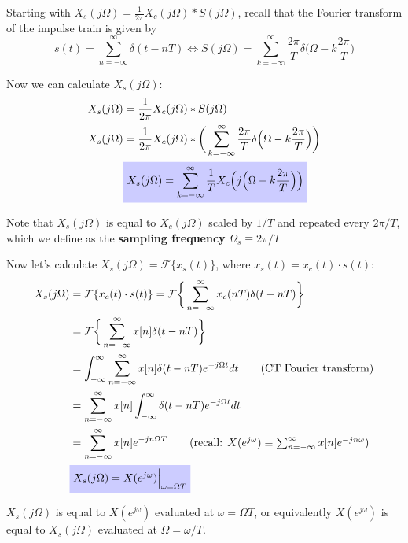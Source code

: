 \documentclass[10pt, aspectratio=169]{beamer}
\begin{document}
%
\begin{frame}

Starting with $X_s(j\Omega) = \frac{1}{2\pi}X_c(j\Omega)\ast S(j\Omega)$, recall that the Fourier transform of the impulse train is given by
\begin{equation*}
s(t) = \sum_{n=-\infty}^\infty \delta(t-nT) \Longleftrightarrow S(j\Omega) = \sum_{k=-\infty}^\infty \frac{2\pi}{T}\delta\Big(\Omega-k\frac{2\pi}{T}\Big)
\end{equation*}

Now we can calculate $X_s(j\Omega)$:
\begin{align} \nonumber
X_s(j\Omega) &= \frac{1}{2\pi}X_c(j\Omega) \ast S(j\Omega) \\ \nonumber
X_s(j\Omega) &= \frac{1}{2\pi}X_c(j\Omega) \ast \bigg(\sum_{k=-\infty}^\infty\frac{2\pi}{T}\delta\Big(\Omega-k\frac{2\pi}{T}\Big)\bigg) \\ 
&\tikz[baseline]{
	\node[fill=blue!20,anchor=base] (t1) {$X_s(j\Omega) = \displaystyle\sum_{k=-\infty}^\infty\frac{1}{T}X_c\Big(j\Big(\Omega-k\frac{2\pi}{T}\Big)\Big)$};} \label{eq:Xs1}
\end{align}

Note that $X_s(j\Omega)$ is equal to $X_c(j\Omega)$ scaled by $1/T$ and repeated every $2\pi/T$, which we define as the \textbf{sampling frequency} $\Omega_s \equiv  2\pi/T$
\end{frame}

%
\begin{frame}
Now let's calculate $X_s(j\Omega) = \mathcal{F}\{x_s(t)\}$, where $x_s(t) = x_c(t)\cdot s(t)$:
\begin{align} \nonumber
X_s(j\Omega) &= \mathcal{F}\{x_c(t)\cdot s(t)\} = \mathcal{F}\bigg\lbrace \sum_{n=-\infty}^{\infty} x_c(nT)\delta(t-nT) \bigg\rbrace \\ \nonumber
&= \mathcal{F}\bigg\lbrace \sum_{n=-\infty}^{\infty} x[n]\delta(t-nT) \bigg\rbrace \\ \nonumber
&= \int_{-\infty}^{\infty}\sum_{n=-\infty}^{\infty} x[n]\delta(t-nT)e^{-j\Omega t}dt \tag{CT Fourier transform} \\ \nonumber
&= \sum_{n=-\infty}^{\infty} x[n]\int_{-\infty}^{\infty}\delta(t-nT)e^{-j\Omega t}dt \\ \nonumber
&= \sum_{n=-\infty}^{\infty} x[n]e^{-jn\Omega T} \tag{recall: $X(e^{j\omega}) \equiv \sum_{n=-\infty}^{\infty} x[n]e^{-jn\omega}$} \\
&\tikz[baseline]{
	\node[fill=blue!20,anchor=base] (t1) {$X_s(j\Omega) = X(e^{j\omega})\Big|_{\omega=\Omega T}$};} \label{eq:Xs2}
\end{align}

$X_s(j\Omega)$ is equal to $X(e^{j\omega})$ evaluated at $\omega = \Omega T$, or equivalently $X(e^{j\omega})$  is equal to $X_s(j\Omega)$ evaluated at $\Omega = \omega/T$.
\end{frame}
\end{document}
